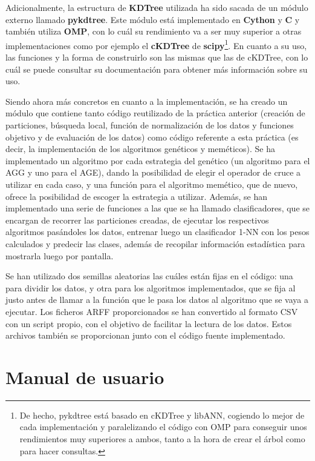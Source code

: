 \documentclass[11pt,a4paper]{article}
\begin{document}
Adicionalmente, la estructura de \textbf{KDTree} utilizada ha sido sacada de un módulo externo llamado
\textbf{pykdtree}\cite{pykdtree}. Este módulo está implementado en \textbf{Cython} y \textbf{C} y también utiliza
\textbf{OMP}, con lo cuál su rendimiento va a ser muy superior a otras implementaciones como por ejemplo el \textbf{cKDTree}
de \textbf{scipy}\footnote{De hecho, pykdtree está basado en cKDTree y libANN, cogiendo lo
mejor de cada implementación y paralelizando el código con OMP para conseguir unos rendimientos muy superiores a ambos,
tanto a la hora de crear el árbol como para hacer consultas.}. En cuanto a su uso, las funciones y la forma de construirlo
son las mismas que las de cKDTree, con lo cuál se puede consultar su documentación\cite{ckdtree} para obtener más información
sobre su uso.

Siendo ahora más concretos en cuanto a la implementación, se ha creado un módulo que contiene tanto código reutilizado de la
práctica anterior (creación de particiones, búsqueda local, función de normalización de los datos y funciones objetivo y de
evaluación de los datos) como código referente a esta práctica (es decir, la implementación de los algoritmos genéticos y
meméticos). Se ha implementado un algoritmo por cada estrategia del genético (un algoritmo para el AGG y uno para el AGE),
dando la posibilidad de elegir el operador de cruce a utilizar en cada caso, y una función para el algoritmo memético, que de
nuevo, ofrece la posibilidad de escoger la estrategia a utilizar. Además, se han implementado una serie de funciones a las
que se ha llamado clasificadores, que se encargan de recorrer las particiones creadas, de ejecutar los respectivos algoritmos
pasándoles los datos, entrenar luego un clasificador 1-NN con los pesos calculados y predecir las clases, además de recopilar
información estadística para mostrarla luego por pantalla. 

Se han utilizado dos semillas aleatorias las cuáles están fijas en el código: una para dividir los datos, y otra para los
algoritmos implementados, que se fija al justo antes de llamar a la función que le pasa los datos al algoritmo que se vaya a
ejecutar. Los ficheros ARFF proporcionados se han convertido al formato CSV con un script propio, con el objetivo de facilitar
la lectura de los datos. Estos archivos también se proporcionan junto con el código fuente implementado.

\newpage

\section{Manual de usuario}
\end{document}
